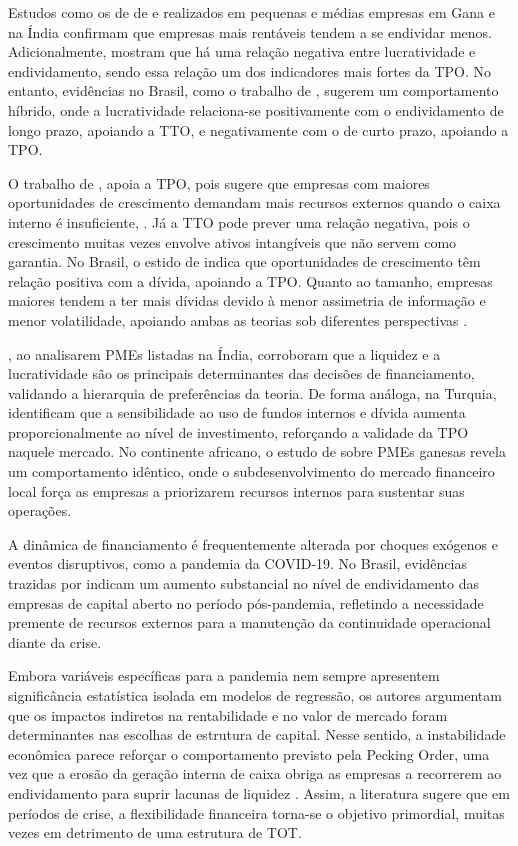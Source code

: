 \documentclass[a4paper,12pt]{article}
\begin{document}
Estudos como os de de  e  realizados em pequenas e médias empresas em Gana e na Índia confirmam que empresas mais rentáveis tendem a se endividar menos. Adicionalmente, mostram que há uma relação negativa entre lucratividade e endividamento, sendo essa relação um dos indicadores mais fortes da TPO. No entanto, evidências no Brasil, como o trabalho de , sugerem um comportamento híbrido, onde a lucratividade relaciona-se positivamente com o endividamento de longo prazo, apoiando a TTO, e negativamente com o de curto prazo, apoiando a TPO.
    
O trabalho de , apoia a TPO, pois sugere que empresas com maiores oportunidades de crescimento demandam mais recursos externos quando o caixa interno é insuficiente, . Já a TTO pode prever uma relação negativa, pois o crescimento muitas vezes envolve ativos intangíveis que não servem como garantia. No Brasil, o estido de  indica que oportunidades de crescimento têm relação positiva com a dívida, apoiando a TPO. Quanto ao tamanho, empresas maiores tendem a ter mais dívidas devido à menor assimetria de informação e menor volatilidade, apoiando ambas as teorias sob diferentes perspectivas \cite{Agyei2020}.

, ao analisarem PMEs listadas na Índia, corroboram que a liquidez e a lucratividade são os principais determinantes das decisões de financiamento, validando a hierarquia de preferências da teoria. De forma análoga, na Turquia,  identificam que a sensibilidade ao uso de fundos internos e dívida aumenta proporcionalmente ao nível de investimento, reforçando a validade da TPO naquele mercado. No continente africano, o estudo de  sobre PMEs ganesas revela um comportamento idêntico, onde o subdesenvolvimento do mercado financeiro local força as empresas a priorizarem recursos internos para sustentar suas operações.

A dinâmica de financiamento é frequentemente alterada por choques exógenos e eventos disruptivos, como a pandemia da COVID-19. No Brasil, evidências trazidas por  indicam um aumento substancial no nível de endividamento das empresas de capital aberto no período pós-pandemia, refletindo a necessidade premente de recursos externos para a manutenção da continuidade operacional diante da crise.

Embora variáveis específicas para a pandemia nem sempre apresentem significância estatística isolada em modelos de regressão, os autores argumentam que os impactos indiretos na rentabilidade e no valor de mercado foram determinantes nas escolhas de estrutura de capital. Nesse sentido, a instabilidade econômica parece reforçar o comportamento previsto pela Pecking Order, uma vez que a erosão da geração interna de caixa obriga as empresas a recorrerem ao endividamento para suprir lacunas de liquidez \cite{Souza2024}. Assim, a literatura sugere que em períodos de crise, a flexibilidade financeira torna-se o objetivo primordial, muitas vezes em detrimento de uma estrutura de TOT.
\end{document}

